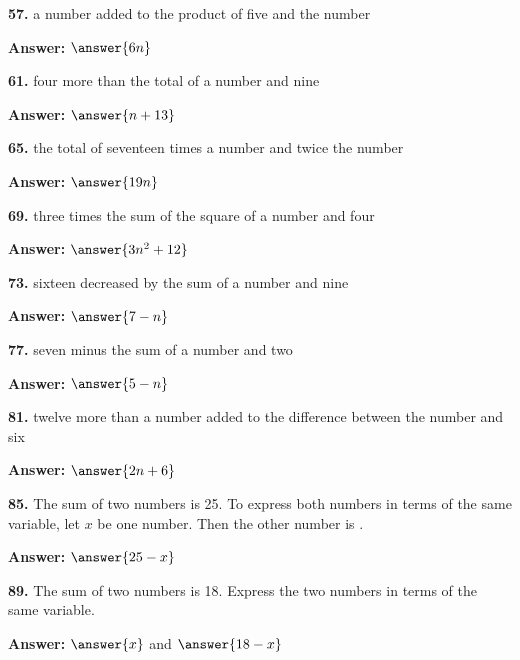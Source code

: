 \documentclass{ximera}
\begin{document}
\begin{problem}
\textbf{57.} a number added to the product of five and the number

\textbf{Answer:} $\answer{6n}$
\end{problem}

\begin{problem}
\textbf{61.} four more than the total of a number and nine

\textbf{Answer:} $\answer{n+13}$
\end{problem}

\begin{problem}
\textbf{65.} the total of seventeen times a number and twice the number

\textbf{Answer:} $\answer{19n}$
\end{problem}

\begin{problem}
\textbf{69.} three times the sum of the square of a number and four

\textbf{Answer:} $\answer{3n^2+12}$
\end{problem}

\begin{problem}
\textbf{73.} sixteen decreased by the sum of a number and nine

\textbf{Answer:} $\answer{7-n}$
\end{problem}

\begin{problem}
\textbf{77.} seven minus the sum of a number and two

\textbf{Answer:} $\answer{5-n}$
\end{problem}

\begin{problem}
\textbf{81.} twelve more than a number added to the difference between the number and six

\textbf{Answer:} $\answer{2n+6}$
\end{problem}

\begin{problem}
\textbf{85.} The sum of two numbers is 25. To express both numbers in terms of the same
  variable, let $x$ be one number. Then the other number is \blank.

\textbf{Answer:} $\answer{25-x}$
\end{problem}

\begin{problem}
\textbf{89.} The sum of two numbers is 18. Express the two numbers in terms of the same
  variable.

\textbf{Answer:} $\answer{x}$ and $\answer{18-x}$
\end{problem}
\end{document}
